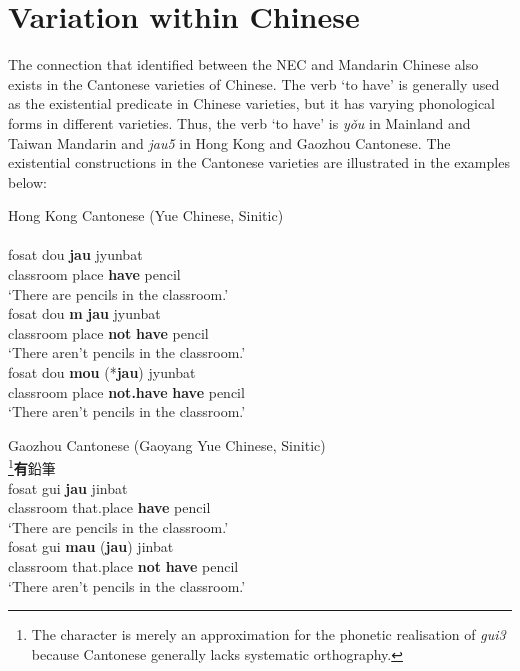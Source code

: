 \documentclass[output=paper]{langscibook}
\begin{document}
\section{Variation within Chinese}\label{s:lam5}

The connection that \citeauthor{Croft1991} identified between the NEC and Mandarin Chinese also exists in the Cantonese varieties of Chinese. The verb `to have' is generally used as the existential predicate in Chinese varieties, but it has varying phonological forms in different varieties. Thus, the verb `to have' is \textit{yǒu} in Mainland and Taiwan Mandarin and \textit{jau5} in Hong Kong and Gaozhou Cantonese. The existential constructions in the Cantonese varieties are illustrated in the examples below: 


\ea Hong Kong Cantonese (Yue Chinese, Sinitic) \label{ex:lam27}\\
  \label{ex:lam27a}\\
  	\gll fosat	dou	\textbf{jau} jyunbat\\
  	classroom place	\textbf{have} pencil\\
  	\glt `There are pencils in the classroom.'
  \label{ex:lam27b}\\
  	\gll *fosat	dou	\textbf{m} \textbf{jau} jyunbat\\
  	classroom place	\textbf{not} \textbf{have} pencil\\
  	\glt `There aren't pencils in the classroom.'
  \label{ex:lam27c}\\
  	\gll fosat	dou	\textbf{mou} (*\textbf{jau}) jyunbat\\
  	classroom	place	\textbf{not.have}	\textbf{have}	pencil\\
  	\glt `There aren't pencils in the classroom.'
\z \z
 
\ea Gaozhou Cantonese (Gaoyang Yue Chinese, Sinitic) \label{ex:lam28}\\
  \footnote{The character is merely an approximation for the phonetic realisation of \textit{gui3} because Cantonese generally lacks systematic orthography.}{\cn \textbf{有}鉛筆} \label{ex:lam28a}\\
  	\gll fosat gui \textbf{jau} jinbat\\	
  	classroom that.place \textbf{have} pencil\\
  	\glt `There are pencils in the classroom.'
   \label{ex:lam28b}\\
  	\gll fosat gui \textbf{mau} (\textbf{jau}) jinbat\\
  	classroom that.place \textbf{not} \textbf{have} pencil\\
  	\glt `There aren't pencils in the classroom.'
\z \z
\end{document}
